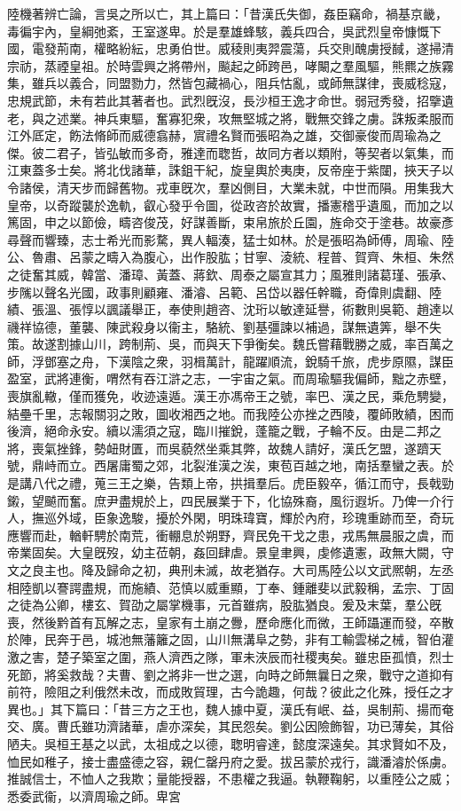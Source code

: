 \begin{pinyinscope}
陸機著辨亡論，言吳之所以亡，其上篇曰：「昔漢氏失御，姦臣竊命，禍基京畿，毒徧宇內，皇綱弛紊，王室遂卑。於是羣雄蜂駭，義兵四合，吳武烈皇帝慷慨下國，電發荊南，權略紛紜，忠勇伯世。威稜則夷羿震蕩，兵交則醜虜授馘，遂掃清宗祊，蒸禋皇祖。於時雲興之將帶州，飈起之師跨邑，哮闞之羣風驅，熊羆之族霧集，雖兵以義合，同盟勠力，然皆包藏禍心，阻兵怙亂，或師無謀律，喪威稔寇，忠規武節，未有若此其著者也。武烈旣沒，長沙桓王逸才命世。弱冠秀發，招擥遺老，與之述業。神兵東驅，奮寡犯衆，攻無堅城之將，戰無交鋒之虜。誅叛柔服而江外厎定，飭法脩師而威德翕赫，賔禮名賢而張昭為之雄，交御豪俊而周瑜為之傑。彼二君子，皆弘敏而多奇，雅達而聦哲，故同方者以類附，等契者以氣集，而江東蓋多士矣。將北伐諸華，誅鉏干紀，旋皇輿於夷庚，反帝座于紫闥，挾天子以令諸侯，清天步而歸舊物。戎車旣次，羣凶側目，大業未就，中世而隕。用集我大皇帝，以奇蹤襲於逸軌，叡心發乎令圖，從政咨於故實，播憲稽乎遺風，而加之以篤固，申之以節儉，疇咨俊茂，好謀善斷，束帛旅於丘園，旌命交于塗巷。故豪彥尋聲而響臻，志士希光而影騖，異人輻湊，猛士如林。於是張昭為師傅，周瑜、陸公、魯肅、呂蒙之疇入為腹心，出作股肱；甘寧、淩統、程普、賀齊、朱桓、朱然之徒奮其威，韓當、潘璋、黃蓋、蔣欽、周泰之屬宣其力；風雅則諸葛瑾、張承、步隲以聲名光國，政事則顧雍、潘濬、呂範、呂岱以器任幹職，奇偉則虞翻、陸績、張溫、張惇以諷議舉正，奉使則趙咨、沈珩以敏達延譽，術數則吳範、趙達以禨祥協德，董襲、陳武殺身以衞主，駱統、劉基彊諫以補過，謀無遺筭，舉不失策。故遂割據山川，跨制荊、吳，而與天下爭衡矣。魏氏嘗藉戰勝之威，率百萬之師，浮鄧塞之舟，下漢陰之衆，羽楫萬計，龍躍順流，銳騎千旅，虎步原隰，謀臣盈室，武將連衡，喟然有吞江滸之志，一宇宙之氣。而周瑜驅我偏師，黜之赤壁，喪旗亂轍，僅而獲免，收迹遠遁。漢王亦馮帝王之號，率巴、漢之民，乘危騁變，結壘千里，志報關羽之敗，圖收湘西之地。而我陸公亦挫之西陵，覆師敗績，困而後濟，絕命永安。續以濡須之寇，臨川摧銳，蓬籠之戰，孑輪不反。由是二邦之將，喪氣挫鋒，勢衄財匱，而吳藐然坐乘其弊，故魏人請好，漢氏乞盟，遂躋天號，鼎峙而立。西屠庸蜀之郊，北裂淮漢之涘，東苞百越之地，南括羣蠻之表。於是講八代之禮，蒐三王之樂，告類上帝，拱揖羣后。虎臣毅卒，循江而守，長戟勁鎩，望飇而奮。庶尹盡規於上，四民展業于下，化協殊裔，風衍遐圻。乃俾一介行人，撫巡外域，臣象逸駿，擾於外閑，明珠瑋寶，輝於內府，珍瑰重跡而至，奇玩應響而赴，輶軒騁於南荒，衝輣息於朔野，齊民免干戈之患，戎馬無晨服之虞，而帝業固矣。大皇旣歿，幼主莅朝，姦回肆虐。景皇聿興，虔修遺憲，政無大闕，守文之良主也。降及歸命之初，典刑未滅，故老猶存。大司馬陸公以文武熈朝，左丞相陸凱以謇諤盡規，而施績、范慎以威重顯，丁奉、鍾離斐以武毅稱，孟宗、丁固之徒為公卿，樓玄、賀劭之屬掌機事，元首雖病，股肱猶良。爰及末葉，羣公旣喪，然後黔首有瓦解之志，皇家有土崩之釁，歷命應化而微，王師躡運而發，卒散於陣，民奔于邑，城池無藩籬之固，山川無溝阜之勢，非有工輸雲梯之械，智伯灌激之害，楚子築室之圍，燕人濟西之隊，軍未浹辰而社稷夷矣。雖忠臣孤憤，烈士死節，將奚救哉？夫曹、劉之將非一世之選，向時之師無曩日之衆，戰守之道抑有前符，險阻之利俄然未改，而成敗貿理，古今詭趣，何哉？彼此之化殊，授任之才異也。」其下篇曰：「昔三方之王也，魏人據中夏，漢氏有岷、益，吳制荊、揚而奄交、廣。曹氏雖功濟諸華，虐亦深矣，其民怨矣。劉公因險飾智，功已薄矣，其俗陋夫。吳桓王基之以武，太祖成之以德，聦明睿達，懿度深遠矣。其求賢如不及，恤民如稚子，接士盡盛德之容，親仁罄丹府之愛。拔呂蒙於戎行，識潘濬於係虜。推誠信士，不恤人之我欺；量能授器，不患權之我逼。執鞭鞠躬，以重陸公之威；悉委武衞，以濟周瑜之師。卑宮
\end{pinyinscope}
